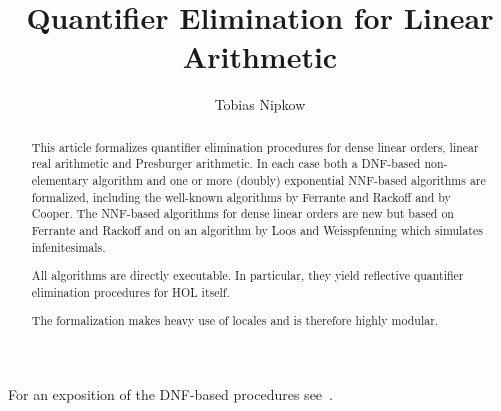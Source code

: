 \documentclass[11pt,a4paper]{article}
\begin{document}
\title{Quantifier Elimination for Linear Arithmetic}
\author{Tobias Nipkow}
\maketitle

\begin{abstract}
This article formalizes quantifier elimination procedures for dense
linear orders, linear real arithmetic and Presburger arithmetic.  In
each case both a DNF-based non-elementary algorithm and one or more
(doubly) exponential NNF-based algorithms are formalized, including
the well-known algorithms by Ferrante and Rackoff and by Cooper. The
NNF-based algorithms for dense linear orders are new but based on
Ferrante and Rackoff and on an algorithm by Loos and Weisspfenning
which simulates infenitesimals.

All algorithms are directly executable. In particular, they yield
reflective quantifier elimination procedures for HOL itself.

The formalization makes heavy use of locales and is therefore highly modular.
\end{abstract}

\noindent
For an exposition of the DNF-based procedures see~\cite{Nipkow-MOD2007}.

\tableofcontents





\end{document}
